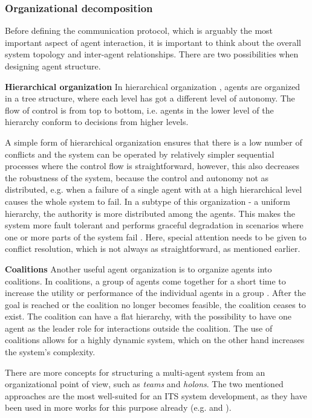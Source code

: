 \documentclass[0main.tex]{subfiles}
\begin{document}
\subsubsection{Organizational decomposition}\label{sec-conflicts}

Before defining the communication protocol, which is arguably the most important aspect of agent 
interaction, it is important to think about the overall system topology and inter-agent 
relationships. There are two possibilities when designing agent structure.

\textbf{Hierarchical organization}\newline
In hierarchical organization \cite{Damba2007}, agents are organized in a tree structure,
where each level has got a different level of autonomy. The flow of control is 
from top to bottom, i.e. agents in the lower level of the hierarchy conform to decisions 
from higher levels. 

A simple form of hierarchical organization ensures that there is a low number of conflicts and
the system can be operated by relatively simpler sequential processes where the control flow
is straightforward, however, this also decreases the robustness of the system, because the
control and autonomy not as distributed, e.g. when a failure of a single agent with at a high
hierarchical level causes the whole system to fail. In a subtype of this organization - a 
uniform hierarchy, the authority is more distributed among the agents. This makes the
system more fault tolerant and performs graceful degradation in scenarios where one or more
parts of the system fail \cite{ParasumannaGokulan2010}. Here, special attention needs to be
given to conflict resolution, which is not always as straightforward, as mentioned earlier. 

\textbf{Coalitions}\newline
Another useful agent organization is to organize agents into coalitions. In coalitions, a group of
agents come together for a short time to increase the utility or performance of the individual
agents in a group \cite{ParasumannaGokulan2010}. After the goal is reached or the coalition no 
longer becomes feasible, the coalition ceases to exist. The coalition can have a flat hierarchy, 
with the possibility to have one agent as the leader role for interactions outside the coalition. 
The use of coalitions allows for a highly dynamic system, which on the other hand increases the
system's complexity. 

There are more concepts for structuring a multi-agent system from an organizational point of view, 
such as \emph{teams} and \emph{holons}. The two mentioned approaches are the most well-suited for 
an ITS system development, as they have been used in more works for this purpose already 
(e.g. \cite{Balaji2007} and \cite{Vijsel2004}). 
\end{document}

